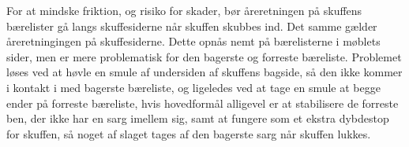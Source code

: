 For at mindske friktion, og risiko for skader, bør åreretningen på skuffens
bærelister gå langs skuffesiderne når skuffen skubbes ind. Det samme gælder
åreretningingen på skuffesiderne. Dette opnås nemt på bærelisterne i møblets
sider, men er mere problematisk for den bagerste og forreste bæreliste.
Problemet løses ved at høvle en smule af undersiden af skuffens bagside, så den
ikke kommer i kontakt i med bagerste bæreliste, og ligeledes ved at tage en
smule at begge ender på forreste bæreliste, hvis hovedformål alligevel er at
stabilisere de forreste ben, der ikke har en sarg imellem sig, samt at fungere
som et ekstra dybdestop for skuffen, så noget af slaget tages af den
bagerste sarg når skuffen lukkes.

